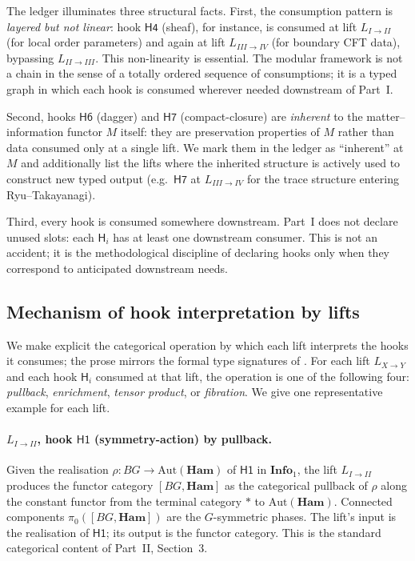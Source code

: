 \documentclass[12pt]{article}
\theoremstyle{definition}
\theoremstyle{remark}
\newcommand{\Info}{\mathbf{Info}}
\newcommand{\Ham}{\mathbf{Ham}}
\begin{document}
\smallskip

The ledger illuminates three structural facts. First, the consumption pattern
is \emph{layered but not linear}\/: hook $\mathsf{H4}$ (sheaf), for instance,
is consumed at lift $L_{I\to II}$ (for local order parameters) and again at
lift $L_{III\to IV}$ (for boundary CFT data), bypassing $L_{II\to III}$.
This non-linearity is essential. The modular framework is not a chain in the
sense of a totally ordered sequence of consumptions; it is a typed graph in
which each hook is consumed wherever needed downstream of Part~I.

Second, hooks $\mathsf{H6}$ (dagger) and $\mathsf{H7}$ (compact-closure) are
\emph{inherent} to the matter--information functor $M$ itself: they are
preservation properties of $M$ rather than data consumed only at a single
lift. We mark them in the ledger as ``inherent'' at $M$ and additionally
list the lifts where the inherited structure is actively used to construct
new typed output (e.g.\ $\mathsf{H7}$ at $L_{III\to IV}$ for the trace
structure entering Ryu--Takayanagi).

Third, every hook is consumed somewhere downstream. Part~I does not declare
unused slots: each $\mathsf{H}_i$ has at least one downstream consumer. This
is not an accident; it is the methodological discipline of declaring hooks
only when they correspond to anticipated downstream needs.

\subsection{Mechanism of hook interpretation by lifts}
\label{sec:hook-mechanism}

We make explicit the categorical operation by which each lift interprets
the hooks it consumes; the prose mirrors the formal type signatures of
. For each lift $L_{X \to Y}$ and each hook
$\mathsf{H}_i$ consumed at that lift, the operation is one of the
following four: \emph{pullback}, \emph{enrichment}, \emph{tensor product},
or \emph{fibration}. We give one representative example for each lift.

\paragraph{$L_{I \to II}$, hook $\mathsf{H1}$ (symmetry-action) by
pullback.}
Given the realisation $\rho : BG \to \mathrm{Aut}(\Ham)$ of $\mathsf{H1}$
in $\Info_1$, the lift $L_{I \to II}$ produces the functor category $[BG,
\Ham]$ as the categorical pullback of $\rho$ along the constant functor
from the terminal category $*$ to $\mathrm{Aut}(\Ham)$. Connected
components $\pi_0([BG, \Ham])$ are the $G$-symmetric phases. The lift's
input is the realisation of $\mathsf{H1}$; its output is the functor
category. This is the standard categorical content of Part~II,
Section~3.
\end{document}
